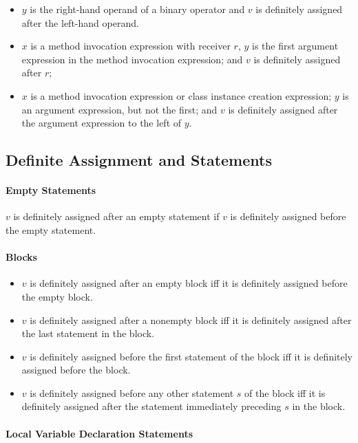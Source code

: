 \begin{itemize}
    \item $y$ is the right-hand operand of a binary operator and $v$ is definitely assigned after the left-hand operand.
    \item $x$ is a method invocation expression with receiver $r$, $y$ is the first argument
          expression in the method invocation expression; and $v$ is
          definitely assigned after $r$;
    \item $x$ is a method invocation
 expression or class instance creation expression; $y$ is an argument expression, but not the first; and $v$ is definitely assigned after the argument expression to the left of $y$.
\end{itemize}

\subsection{Definite Assignment and Statements}


\paragraph{Empty Statements}

$v$ is definitely assigned after an empty statement if  $v$ is definitely assigned
before the empty statement.

\paragraph{Blocks}

\begin{itemize}
    \item $v$ is definitely assigned after an empty block iff it is definitely assigned before the empty block.
    \item $v$ is definitely assigned after a nonempty block iff it is definitely assigned after the last statement in the block.
    \item $v$ is definitely assigned before the first statement of the block iff it is definitely assigned before the block.
    \item $v$ is definitely assigned before any other statement $s$ of the
          block iff it is definitely assigned after the statement immediately
          preceding $s$ in the block. 
\end{itemize}

\paragraph{Local Variable Declaration Statements}

